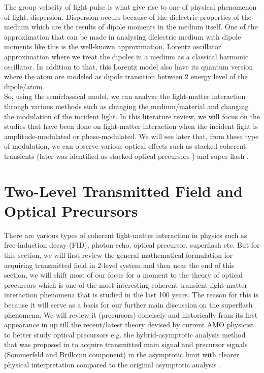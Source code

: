 The group velocity of light pulse is what give rise to one of physical phenomenon of light, dispersion. Dispersion occurs because of the dielectric properties of the medium which are the results of dipole moments in the medium itself. One of the approximation that can be made in analysing dielectric medium with dipole moments like this is the well-known approximation, Lorentz oscillator approximation where we treat the dipoles in a medium as a classical harmonic oscillator. In addition to that, this Lorentz model also have its quantum version where the atom are modeled as dipole transition between 2 energy level of the dipole/atom.\\

So, using the semiclassical model, we can analyze the light-matter interaction through various methods such as changing the medium/material and changing the modulation of the incident light. In this literature review, we will focus on the studies that have been done on light-matter interaction when the incident light is amplitude-modulated or phase-modulated. We will see later that, from these type of modulation, we can observe various optical effects such as stacked coherent transients \cite{Segard_1987} (later was identified as stacked optical precursors \cite{jeong2010slow}) and super-flash \cite{Kwong2014}.\\

\section{Two-Level Transmitted Field and Optical Precursors}
There are various types of coherent light-matter interaction in physics such as free-induction decay (FID), photon echo, optical precursor, superflash etc. But for this section, we will first review the general mathematical formulation for acquiring transmitted field in 2-level system and then near the end of this section, we will shift most of our focus for a moment to the theory of optical precursors which is one of the most interesting coherent transient light-matter interaction phenomena that is studied in the last 100 years. The reason for this is because it will serve as a basis for our further main discussion on the superflash phenomena. We will review it (precursors) concisely and historically from its first appearance in \cite{Sommerfeld1914, Brillouin1914} up till the recent/latest theory devised by current AMO physicist to better study optical precursors e.g. the hybrid-asymptotic analysis method that was proposed in \cite{Jeong2009} to acquire transmitted main signal and precursor signals (Sommerfeld and Brillouin component) in the asymptotic limit with clearer physical interpretation compared to the original asymptotic analysis \cite{Sherman1981}.\\

